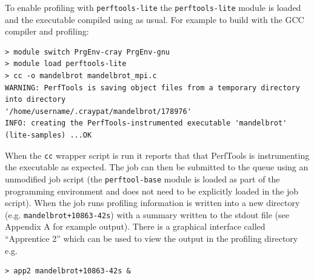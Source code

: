 \documentclass[a4paper,titlepage]{article}
\begin{document}
To enable profiling with \verb+perftools-lite+ the \verb+perftools-lite+ module is loaded and the executable compiled using as usual. For example to build with the GCC compiler and profiling:
\begin{verbatim}
> module switch PrgEnv-cray PrgEnv-gnu 
> module load perftools-lite
> cc -o mandelbrot mandelbrot_mpi.c 
WARNING: PerfTools is saving object files from a temporary directory into directory 
'/home/username/.craypat/mandelbrot/178976'
INFO: creating the PerfTools-instrumented executable 'mandelbrot' (lite-samples) ...OK
\end{verbatim}
When the \verb+cc+ wrapper script is run it reports that that PerfTools is instrumenting the executable as expected.
The job can then be submitted to the queue using an unmodified job script (the \texttt{perftool-base} module is loaded as part of the programming environment and does not need to be explicitly loaded in the job script). When the job runs profiling information is written into a new directory (e.g. \verb|mandelbrot+10863-42s|) with a summary written to the stdout file (see Appendix A for example output). There is a graphical interface called ``Apprentice 2'' which can be used to view the output in the profiling directory e.g. 
\begin{verbatim}
> app2 mandelbrot+10863-42s &
\end{verbatim}
\end{document}
